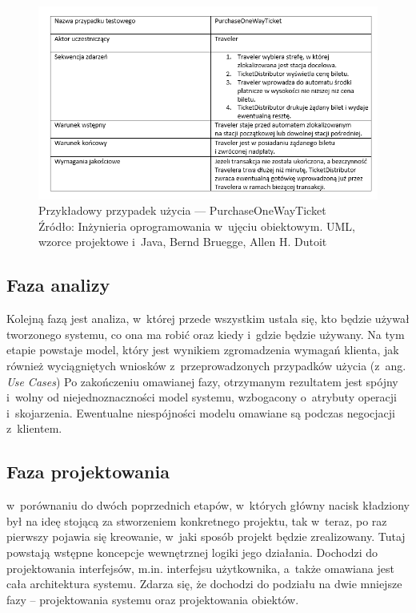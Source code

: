 \documentclass[oneside,polski,logo]{amuthesis}
\begin{document}
\begin{figure}[h]
	\centering
	\includegraphics[width=13cm]{images/hyps/use-case.png}
	\caption{Przykładowy przypadek użycia — PurchaseOneWayTicket \\ Źródło:  Inżynieria oprogramowania w~ujęciu obiektowym. UML, wzorce projektowe i~Java, Bernd Bruegge, Allen H. Dutoit}
\end{figure}

\subsection {Faza analizy}
Kolejną fazą jest analiza, w~której przede wszystkim ustala się, kto będzie używał tworzonego systemu, co ona ma robić oraz kiedy i~gdzie będzie używany. Na tym etapie powstaje model, który jest wynikiem zgromadzenia wymagań klienta, jak również wyciągniętych wniosków z~przeprowadzonych przypadków użycia (z~ang. \emph{Use Cases}) Po zakończeniu omawianej fazy, otrzymanym rezultatem jest spójny i~wolny od niejednoznaczności model systemu, wzbogacony o~atrybuty operacji i~skojarzenia. Ewentualne niespójności modelu omawiane są podczas negocjacji z~klientem.

\subsection {Faza projektowania}
w~porównaniu do dwóch poprzednich etapów, w~których główny nacisk kładziony był na ideę stojącą za stworzeniem konkretnego projektu, tak w~teraz, po raz pierwszy pojawia się kreowanie, w~jaki sposób projekt będzie zrealizowany. Tutaj powstają wstępne koncepcje wewnętrznej logiki jego działania. Dochodzi do projektowania interfejsów, m.in. interfejsu użytkownika, a~także omawiana jest cała architektura systemu. Zdarza się, że dochodzi do podziału na dwie mniejsze fazy – projektowania systemu oraz projektowania obiektów.
\end{document}
